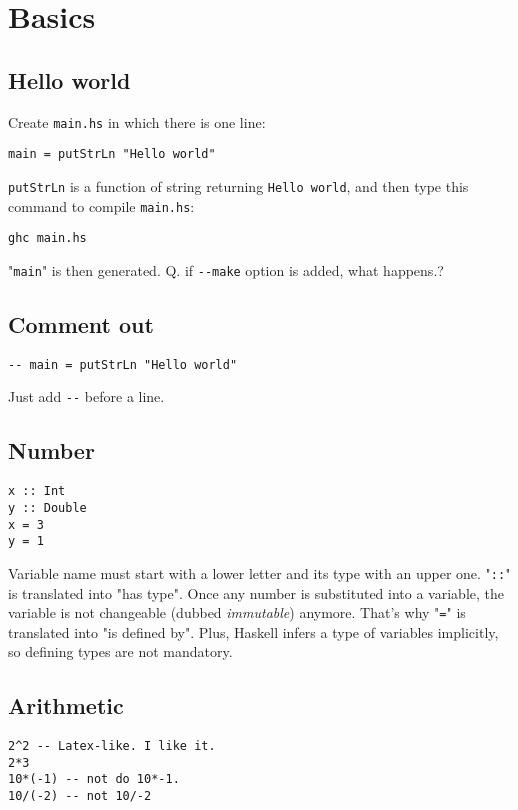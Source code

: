 \section{Basics}

\subsection{Hello world}

Create \lstinline{main.hs} in which there is one line:
\begin{lstlisting}
main = putStrLn "Hello world"
\end{lstlisting}
\lstinline{putStrLn} is a function of string returning \lstinline{Hello world}, and then type this command to compile \lstinline{main.hs}:
\begin{lstlisting}
ghc main.hs
\end{lstlisting}
"\lstinline{main}" is then generated. 
Q. if \lstinline{--make} option is added, what happens.?

\subsection{Comment out}
\begin{lstlisting}
-- main = putStrLn "Hello world"
\end{lstlisting}
Just add \lstinline{--}  before a line.

\subsection{Number}

\begin{lstlisting}
x :: Int
y :: Double 
x = 3
y = 1
\end{lstlisting}
Variable name must start with a lower letter and its type with an upper one. "\lstinline{::}" is translated into "has type". Once any number is substituted into a variable,  the variable is not changeable (dubbed {\it immutable}) anymore. That's why "\lstinline{=}" is translated into "is defined by". Plus, Haskell infers a type of variables implicitly, so defining types are not mandatory.

\subsection{Arithmetic}

\begin{lstlisting}
2^2 -- Latex-like. I like it.
2*3
10*(-1) -- not do 10*-1.
10/(-2) -- not 10/-2
\end{lstlisting}

